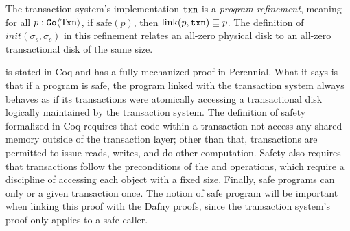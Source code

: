 \begin{theorem}
  The transaction system's implementation $\texttt{txn}$ is a \emph{program refinement}, meaning for
  all $p : \mathtt{Go}\langle \mathrm{Txn} \rangle$, if $\mathrm{safe}(p)$, then
  $\mathrm{link}(p, \texttt{txn}) \sqsubseteq p$. The definition of
  $init(\sigma_{s}, \sigma_{c})$ in this refinement relates an all-zero physical
  disk to an all-zero transactional disk of the same size.
  \label{thm:gotxn-program-refinement}
\end{theorem}

 is stated in Coq and has a fully mechanized proof in Perennial.
What it says is that if a program is safe, the program linked with the
transaction system always behaves as if its transactions were atomically
accessing a transactional disk logically maintained by the transaction system.
The definition of safety formalized in Coq requires that code within a
transaction not access any shared memory outside of the transaction layer; other
than that, transactions are permitted to issue reads, writes, and do other
computation. Safety also requires that transactions follow the preconditions of
the  and  operations, which require a discipline of accessing
each object with a fixed size. Finally, safe programs can only  or
 a given transaction once. The notion of safe program will be
important when linking this proof with the Dafny proofs, since the transaction
system's proof only applies to a safe caller.
